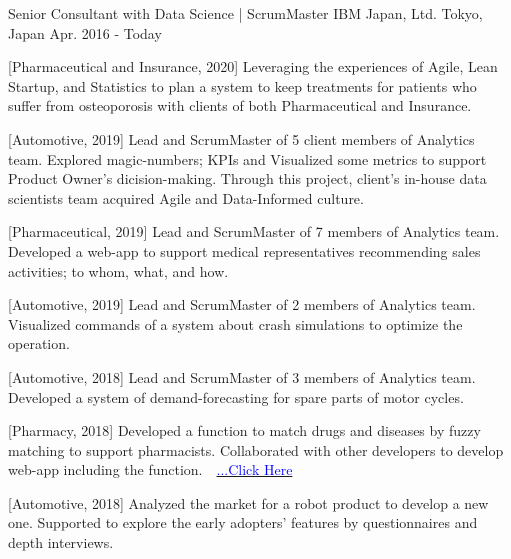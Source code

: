 

\begin{cventries}

  \cventry
    {Senior Consultant with Data Science | ScrumMaster} %
    {IBM Japan, Ltd.} %
    {Tokyo, Japan} %
    {Apr. 2016 - Today} %
    {
      \begin{cvenumerate} %
        \item {[Pharmaceutical and Insurance, 2020] Leveraging the experiences of Agile, Lean Startup, and Statistics to plan a system to keep treatments for patients who suffer from osteoporosis with clients of both Pharmaceutical and Insurance.}
        \item {[Automotive, 2019] Lead and ScrumMaster of 5 client members of Analytics team. Explored magic-numbers; KPIs and Visualized some metrics to support Product Owner's dicision-making. Through this project, client's in-house data scientists team acquired Agile and Data-Informed culture.}
        \item {[Pharmaceutical, 2019] Lead and ScrumMaster of 7 members of Analytics team. Developed a web-app to support medical representatives recommending sales activities; to whom, what, and how.}
        \item {[Automotive, 2019] Lead and ScrumMaster of 2 members of Analytics team. Visualized commands of a system about crash simulations to optimize the operation.}
        \item {[Automotive, 2018] Lead and ScrumMaster of 3 members of Analytics team. Developed a system of demand-forecasting for spare parts of motor cycles.}
        \item {[Pharmacy, 2018] Developed a function to match drugs and diseases by fuzzy matching to support pharmacists. Collaborated with other developers to develop web-app including the function.　\href{https://www.ibm.com/think/jp-ja/business/sakura-ai/}{\textcolor{blue}{...Click Here}}}
        \item {[Automotive, 2018] Analyzed the market for a robot product to develop a new one. Supported to explore the early adopters' features by questionnaires and depth interviews.}

\end{cvenumerate}}
\end{cventries}
